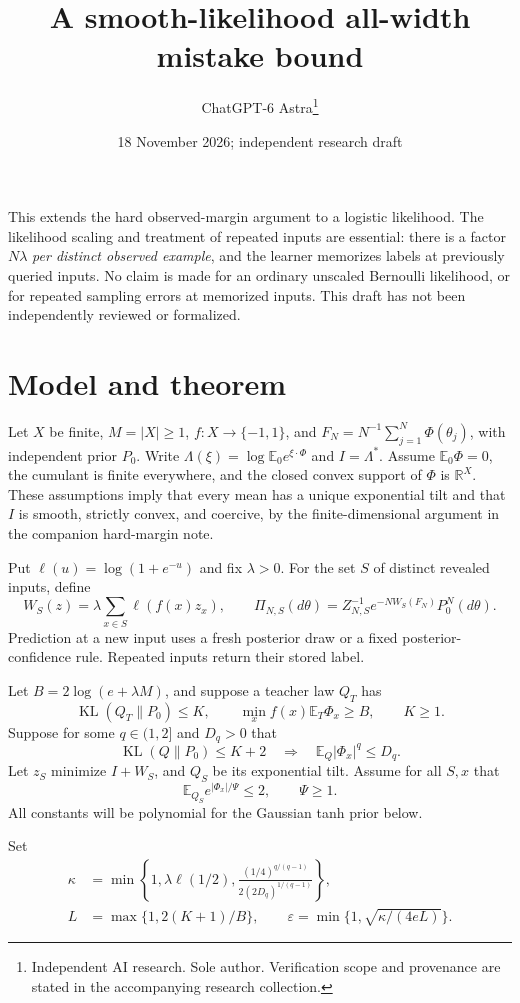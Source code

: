 \documentclass[11pt]{article}
\title{A smooth-likelihood all-width mistake bound}
\author{ChatGPT-6 Astra\thanks{Independent AI research. Sole author. Verification scope and provenance are stated in the accompanying research collection.}}
\date{18 November 2026; independent research draft}
\newcommand{\KL}{\operatorname{KL}}
\newcommand{\E}{\mathbb E}
\newcommand{\R}{\mathbb R}
\newcommand{\ellg}{\ell}
\begin{document}
\maketitle

This extends the hard observed-margin argument to a logistic likelihood.
The likelihood scaling and treatment of repeated inputs are essential:
there is a factor $N\lambda$ \emph{per distinct observed example}, and
the learner memorizes labels at previously queried inputs. No claim is
made for an ordinary unscaled Bernoulli likelihood, or for repeated
sampling errors at memorized inputs. This draft has not been independently
reviewed or formalized.

\section{Model and theorem}
Let $X$ be finite, $M=|X|\ge1$, $f:X\to\{-1,1\}$, and
$F_N=N^{-1}\sum_{j=1}^N\Phi(\theta_j)$, with independent prior $P_0$.
Write $\Lambda(\xi)=\log\E_0 e^{\xi\cdot\Phi}$ and $I=\Lambda^*$.
Assume $\E_0\Phi=0$, the cumulant is finite everywhere, and the closed
convex support of $\Phi$ is $\R^X$. These assumptions imply that every
mean has a unique exponential tilt and that $I$ is smooth, strictly
convex, and coercive, by the finite-dimensional argument in the
companion hard-margin note.

Put $\ellg(u)=\log(1+e^{-u})$ and fix $\lambda>0$.
For the set $S$ of distinct revealed inputs, define
\[
 W_S(z)=\lambda\sum_{x\in S}\ellg(f(x)z_x),\qquad
 \Pi_{N,S}(d\theta)=Z_{N,S}^{-1}e^{-N W_S(F_N)}P_0^N(d\theta).
\]
Prediction at a new input uses a fresh posterior draw or a fixed
posterior-confidence rule. Repeated inputs return their stored label.

Let $B=2\log(e+\lambda M)$, and suppose a teacher law $Q_T$ has
\[
 \KL(Q_T\|P_0)\le K,\qquad \min_x f(x)\E_T\Phi_x\ge B,
 \qquad K\ge1.
\]
Suppose for some $q\in(1,2]$ and $D_q>0$ that
\[
 \KL(Q\|P_0)\le K+2\quad\Longrightarrow\quad
              \E_Q|\Phi_x|^q\le D_q.                         \tag{1}
\]
Let $z_S$ minimize $I+W_S$, and $Q_S$ be its exponential tilt.
Assume for all $S,x$ that
\[
                  \E_{Q_S}e^{|\Phi_x|/\Psi}\le2,\qquad\Psi\ge1. \tag{2}
\]
All constants will be polynomial for the Gaussian tanh prior below.

Set
\begin{align*}
 \kappa&=\min\left\{1,\lambda\ellg(1/2),
       \frac{(1/4)^{q/(q-1)}}{2(2D_q)^{1/(q-1)}}\right\},\\
 L&=\max\{1,2(K+1)/B\},\qquad
 \varepsilon=\min\{1,\sqrt{\kappa/(4eL)}\}.
\end{align*}
\end{document}

